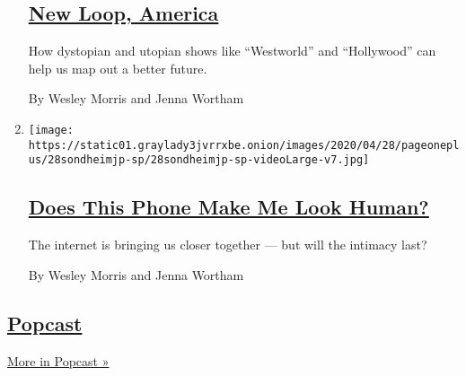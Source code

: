\begin{enumerate}
  \hypertarget{new-loop-america}{%
  \subsection{\texorpdfstring{\href{/2020/05/14/podcasts/still-processing-westworld-hollywood-utopia-dystopia.html}{New
  Loop, America}}{New Loop, America}}\label{new-loop-america}}

  How dystopian and utopian shows like ``Westworld'' and ``Hollywood''
  can help us map out a better future.

  By Wesley Morris and Jenna Wortham
\item
  \texttt{[image: https://static01.graylady3jvrrxbe.onion/images/2020/04/28/pageoneplus/28sondheimjp-sp/28sondheimjp-sp-videoLarge-v7.jpg]}

  \hypertarget{does-this-phone-make-me-look-human}{%
  \subsection{\texorpdfstring{\href{/2020/05/07/podcasts/still-processing-internet-vulnerability-sondheim-parks-recreation.html}{Does
  This Phone Make Me Look
  Human?}}{Does This Phone Make Me Look Human?}}\label{does-this-phone-make-me-look-human}}

  The internet is bringing us closer together --- but will the intimacy
  last?

  By Wesley Morris and Jenna Wortham
\end{enumerate}

\hypertarget{popcast}{%
\subsection{\texorpdfstring{\href{/column/popcast-pop-music-podcast}{Popcast}}{Popcast}}\label{popcast}}

\href{/column/popcast-pop-music-podcast}{More in Popcast »}

